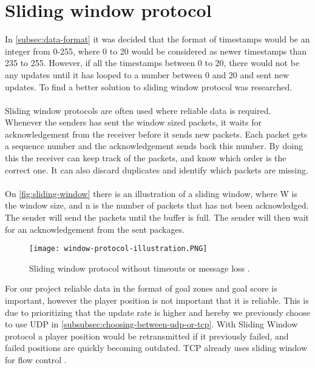 \section{Sliding window protocol}
In \autoref{subsec:data-format} it was decided that the format of timestamps would be an integer from 0-255, where 0 to 20 would be considered as newer timestamps than 235 to 255.
However, if all the timestamps between 0 to 20, there would not be any updates until it has looped to a number between 0 and 20 and sent new updates.
To find a better solution to sliding window protocol was researched.
\\\\
Sliding window protocols are often used where reliable data is required.
Whenever the senders has sent the window sized packets, it waits for acknowledgement from the receiver before it sends new packets.
Each packet gets a sequence number and the acknowledgement sends back this number.
By doing this the receiver can keep track of the packets, and know which order is the correct one.
It can also discard duplicates and identify which packets are missing.
\\\\
On \autoref{fig:sliding-window} there is an illustration of a sliding window, where W is the window size, and n is the number of packets that has not been acknowledged.
The sender will send the packets until the buffer is full.
The sender will then wait for an acknowledgement from the sent packages.
\begin{figure}[H]
    \centering
    \texttt{[image: window-protocol-illustration.PNG]}
    \caption{Sliding window protocol without timeouts or message loss \cite{design-and-validation-of-computer-protocols}.}
    \label{fig:sliding-window}
\end{figure}
\noindent
For our project reliable data in the format of goal zones and goal score is important, however the player position is not important that it is reliable.
This is due to prioritizing that the update rate is higher and hereby we previously choose to use UDP in \autoref{subsubsec:choosing-between-udp-or-tcp}.
With Sliding Window protocol a player position would be retransmitted if it previously failed, and failed positions are quickly becoming outdated.
TCP already uses sliding window for flow control \cite{ibm:sliding-window}.
